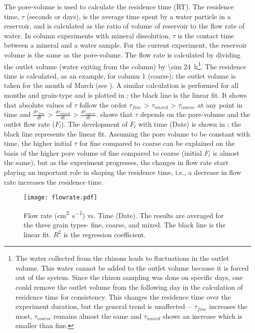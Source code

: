 The pore-volume is used to calculate the residence time (RT). The residence time, $\tau$ (seconds or days), is the average time spent by a water particle in a reservoir, and is calculated as the ratio of volume of reservoir to the flow rate of water. In column experiments with mineral dissolution, $\tau$ is the contact time between a mineral and a water sample. For the current experiment, the reservoir volume is the same as the pore-volume. The flow rate is calculated by dividing the outlet volume (water exiting from the column) by \SI{\sim 24}{\hour}\footnote{The water collected from the rhizons leads to fluctuations in the outlet volume. This water cannot be added to the outlet volume because it is forced out of the system. Since the rhizon sampling was done on specific days, one could remove the outlet volume from the following day in the calculation of residence time for consistency. This changes the residence time over the experiment duration, but the general trend is unaffected--- $\tau_{fine}$ increases the most, $\tau_{coarse}$ remains almost the same and $\tau_{mixed}$ shows an increase which is smaller than fine.}. The residence time is calculated, as an example, for column 1 (coarse); the outlet volume is taken for the month of March (see ). A similar calculation is performed for all months and grain-type and is plotted in ; the black line is the linear fit. It shows that absolute values of $\tau$ follow the order $\tau_{fine}$ > $\tau_{mixed}$ > $\tau_{coarse}$ at any point in time and  $\frac{d\tau_{fine}}{dt}$ > $\frac{d\tau_{mixed}}{dt}$ > $\frac{d\tau_{coarse}}{dt}$.  shows that $\tau$ depends on the pore-volume and the outlet flow rate ($F_l$). The development of $F_l$ with time (Date) is shown in ; the black line represents the linear fit. Assuming the pore volume to be constant with time, the higher initial $\tau$ for fine compared to coarse can be explained on the basis of the higher pore volume of fine compared to coarse (initial $F_l$ is almost the same), but as the experiment progresses, the changes in flow rate start playing an important role in shaping the residence time, i.e., a decrease in flow rate increases the residence time.
\begin{figure}[h]

\centering
\texttt{[image: flowrate.pdf]}
\caption{Flow rate (\si{cm^3s^{-1}}) vs. Time (Date). The results are averaged for the three grain types- fine, coarse, and mixed. The black line is the linear fit. $R^2$ is the regression coefficient.}
\label{fig:results_fr}
\end{figure}


